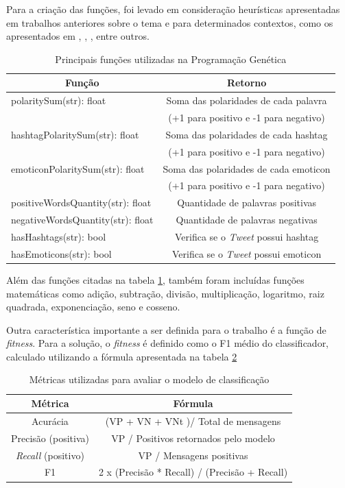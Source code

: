 \documentclass[12pt]{article}
\begin{document}
Para a criação das funções, foi levado em consideração heurísticas apresentadas em trabalhos anteriores sobre o tema e para determinados contextos, como os apresentados em \cite{araujo2013metodos}, \cite{Rodrigues2016}, \cite{Turney2002}, entre outros.

\begin{table}[H]
	\centering
	\begin{tabular}{lc}
	\multicolumn{1}{c}{\textbf{Função}} & \multicolumn{1}{c}{\textbf{Retorno}} \\
	\hline
	polaritySum(str): float & Soma das polaridades de cada palavra \\& (+1 para positivo e -1 para negativo) \\
	\hline
	hashtagPolaritySum(str): float & Soma das polaridades de cada hashtag \\& (+1 para positivo e -1 para negativo) \\
	\hline
	emoticonPolaritySum(str): float & Soma das polaridades de cada emoticon \\& (+1 para positivo e -1 para negativo) \\
	\hline
	positiveWordsQuantity(str): float & Quantidade de palavras positivas \\
	\hline
	negativeWordsQuantity(str): float & Quantidade de palavras negativas \\
	\hline
	hasHashtags(str): bool & Verifica se o \emph{Tweet} possui hashtag \\
	\hline
	hasEmoticons(str): bool & Verifica se o \emph{Tweet} possui emoticon \\
	\hline
	\end{tabular}
	\caption{Principais funções utilizadas na Programação Genética}
	\label{tab_functions}
\end{table}

Além das funções citadas na tabela \ref{tab_functions}, também foram incluídas funções matemáticas como adição, subtração, divisão, multiplicação, logaritmo, raiz quadrada, exponenciação, seno e cosseno.

Outra característica importante a ser definida para o trabalho é a função de \emph{fitness}. Para a solução, o \emph{fitness} é definido como o F1 médio do classificador, calculado utilizando a fórmula apresentada na tabela \ref{metrics}

\begin{table}[H]
\centering
	\begin{tabular}{cc}
	\textbf{Métrica} & \textbf{Fórmula} \\ \hline
	Acurácia & (VP + VN + VNt )/ Total de mensagens \\ \hline
	Precisão (positiva) & VP / Positivos retornados pelo modelo \\ \hline
	\textit{Recall} (positivo) & VP / Mensagens positivas \\ \hline
	F1 & 2 x (Precisão * Recall) / (Precisão + Recall) \\ \hline
	\end{tabular}
	\caption{Métricas utilizadas para avaliar o modelo de classificação}
	\label{metrics}
\end{table}
\end{document}
